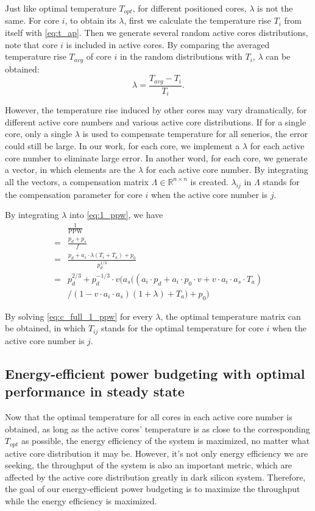 Just like optimal temperature $T_{opt}$, for different positioned cores, $\lambda$ is not the same. For core $i$, to obtain its $\lambda$, first we calculate the temperature rise $T_{i}$ from itself with \eqref{eq:t_ap}. Then we generate several random active cores distributions, note that core $i$ is included in active cores. By comparing the averaged temperature rise $T_{avg}$ of core $i$ in the random distributions with $T_{i}$, $\lambda$ can be obtained:
\begin{equation}\label{eq:lambda}
\lambda = \frac{T_{avg}-T_{i}}{T_{i}}.
\end{equation}

However, the temperature rise induced by other cores may vary dramatically, for different active core numbers and various active core distributions. If for a single core, only a single $\lambda$ is used to compensate temperature for all senerios, the error could still be large. In our work, for each core, we implement a $\lambda$ for each active core number to eliminate large error. In another word, for each core, we generate a vector, in which elements are the $\lambda$ for each active core number. By integrating all the vectors, a compensation matrix $\Lambda \in \mathbb{R}^{n \times n}$ is created. $\lambda_{ij}$ in $\Lambda$ stands for the compensation parameter for core $i$ when the active core number is $j$.


By integrating $\lambda$ into \eqref{eq:1_ppw}, we have
\begin{equation}\label{eq:c_full_1_ppw}
\begin{split}
&\frac{1}{\text{PPW}}\\
=&\frac{p_{d}+p_{s}}{f}\\
=&\frac{p_{d}+a_{s} \cdot \lambda(T_{i}+T_{a})+p_{0}}{p_{d}^{1/3}}\\
=&p_{d}^{2/3}+p_{d}^{-1/3}\cdot v(a_{s} ((a_{i} \cdot p_{d}+a_{i} \cdot p_{0} \cdot v+v \cdot a_{i} \cdot a_{s} \cdot T_{a})\\
&/(1-v \cdot a_{i} \cdot a_{s})(1+\lambda)+T_{a})+p_{0})
\end{split}
\end{equation}

By solving \eqref{eq:c_full_1_ppw} for every $\lambda$, the optimal temperature matrix can be obtained, in which $T_{ij}$ stands for the optimal temperature for core $i$ when the active core number is $j$.

\subsection{Energy-efficient power budgeting with optimal performance in steady state}
Now that the optimal temperature for all cores in each active core number is obtained, as long as the active cores' temperature is as close to the corresponding $T_{opt}$ as possible, the energy efficiency of the system is maximized, no matter what active core distribution it may be. However, it's not only energy efficiency we are seeking, the throughput of the system is also an important metric, which are affected by the active core distribution greatly in dark silicon system. Therefore, the goal of our energy-efficient power budgeting is to maximize the throughput while the energy efficiency is maximized.

